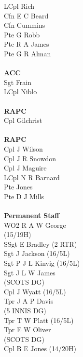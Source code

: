\begin{multicols}{3}
  LCpl Rich \\
  Cfn E C Beard \\
  Cfn Cummins \\
  Pte G Robb \\
  Pte R A James \\
  Pte G R Alman \\
  \\
  \textbf{ACC} \\
  Sgt Frain \\
  LCpl Niblo \\
  \\
  \textbf{RAPC} \\
  Cpl Gilchrist \\
  \\
  \textbf{RAPC} \\
  Cpl J Wilson \\
  Cpl J R Snowdon \\
  Cpl J Maguire \\
  LCpl N R Barnard \\
  Pte Jones \\
  Pte D J Mills \\
  \\
  \textbf{Permanent Staff} \\
  WO2 R A W George \\ \indent (15/19H) \\
  SSgt E Bradley (2 RTR) \\
  Sgt J Jackson (16/5L) \\
  Sgt P J L Kinvig (16/5L) \\
  Sgt J L W James \\ \indent (SCOTS DG) \\
  Cpl J Wyatt (16/5L) \\
  Tpr J A P Davis \\ \indent (5 INNIS DG) \\
  Tpr T W Platt (16/5L) \\
  Tpr E W Oliver \\ \indent (SCOTS DG) \\
  Cpl B E Jones (14/20H) \\
\end{multicols}

